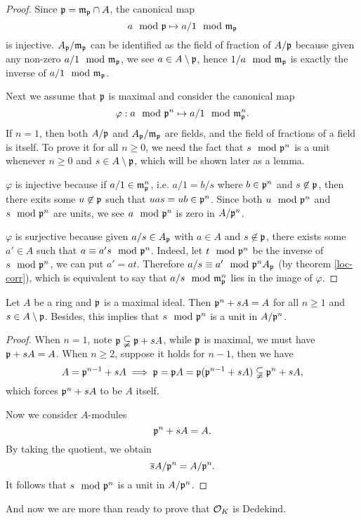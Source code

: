 			\begin{proof}
				Since $\mathfrak{p} = \mathfrak{m}_\mathfrak{p} \cap A$, the canonical map
				\[
					a \mod {\mathfrak}{p} \mapsto a/1 \mod {\mathfrak}{m}_\mathfrak{p}
				\] 
				is injective. $A_\mathfrak{p}/\mathfrak{m}_\mathfrak{p}$ can be identified as the field of fraction of $A/\mathfrak{p}$ because given any non-zero $a/1 \mod {\mathfrak}{m}_\mathfrak{p}$, we see $a \in A \setminus \mathfrak{p}$, hence $1/a \mod {\mathfrak}{m}_\mathfrak{p}$ is exactly the inverse of $a/1 \mod {\mathfrak}{m}_\mathfrak{p}$.
				
				Next we assume that $\mathfrak{p}$ is maximal and consider the canonical map
				\[
					\varphi:a \mod {\mathfrak}{p}^n \mapsto a/1 \mod {\mathfrak}{m}_\mathfrak{p}^n.
				\]
				If $n=1$, then both $A/\mathfrak{p}$ and $A_\mathfrak{p}/\mathfrak{m}_\mathfrak{p}$ are fields, and the field of fractions of a field is itself. To prove it for all $n \ge 0$, we need the fact that $s \mod {\mathfrak}{p}^n$ is a unit whenever $n \ge 0$ and $s \in A \setminus \mathfrak{p}$, which will be shown later as a lemma.
				
				$\varphi$ is injective because if $a/1 \in \mathfrak{m}_\mathfrak{p}^n$, i.e. $a/1 = b/s$ where $b \in \mathfrak{p}^n$ and $s \not \in \mathfrak{p}$, then there exits some $u \not\in \mathfrak{p}$ such that $uas = ub \in \mathfrak{p}^n$. Since both $ u \mod {\mathfrak}{p}^n$ and $s \mod {\mathfrak}{p}^n$ are units, we see $a \mod {\mathfrak}{p}^n$ is zero in $A/\mathfrak{p}^n$. 
				
				$\varphi$ is surjective because given $a/s \in A_\mathfrak{p}$ with $a \in A$ and $s \not\in \mathfrak{p}$, there exists some $a' \in A$ such that $a \equiv a's \mod {\mathfrak}{p}^n$. Indeed, let $t \mod {\mathfrak}{p}^n$ be the inverse of $s \mod {\mathfrak}{p}^n$, we can put $a' = at$. Therefore $a/s \equiv a' \mod {\mathfrak}{p}^nA_\mathfrak{p}$ (by theorem \ref{loc-corr}), which is equivalent to say that $a/s \mod {\mathfrak}{m}_\mathfrak{p}^n$ lies in the image of $\varphi$.
			\end{proof}
			\begin{lemma}
				Let $A$ be a ring and $\mathfrak{p}$ is a maximal ideal. Then $\mathfrak{p}^n+sA=A$ for all $n \ge 1$ and $s \in A \setminus \mathfrak{p}$. Besides, this implies that $s \mod {\mathfrak}{p}^n$ is a unit in $A/\mathfrak{p}^n$.
				\end{lemma}
			\begin{proof}
				When $n=1$, note $\mathfrak{p} \subsetneqq \mathfrak{p}+sA$, while $\mathfrak{p}$ is maximal, we must have $\mathfrak{p}+sA=A$. When $n \ge 2$, suppose it holds for $n-1$, then we have
				\[
				A = \mathfrak{p}^{n-1}+sA \implies \mathfrak{p}=\mathfrak{p}A = \mathfrak{p}(\mathfrak{p}^{n-1}+sA) \subsetneqq \mathfrak{p}^n+sA,
				\]
				which forces $\mathfrak{p}^n+sA$ to be $A$ itself.
				
				Now we consider $A$-modules
				\[
				\mathfrak{p}^n+sA = A.
				\]
				By taking the quotient, we obtain
				\[
				\overline{s}A/\mathfrak{p}^n=A/\mathfrak{p}^n.
				\]
				It follows that $s \mod {\mathfrak}{p}^n$ is a unit in $A/\mathfrak{p}^n$.
			\end{proof}
			And now we are more than ready to prove that $\mathcal{O}_K$ is Dedekind.
			

